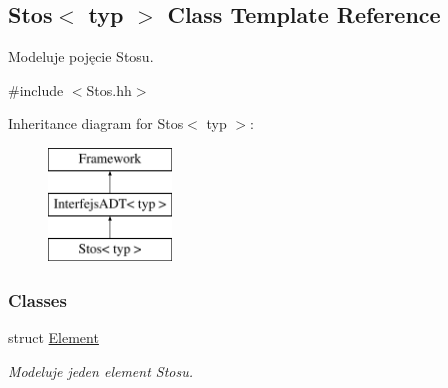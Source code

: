 \hypertarget{class_stos}{\subsection{Stos$<$ typ $>$ Class Template Reference}
\label{class_stos}
}


Modeluje pojęcie Stosu.  




{\ttfamily \#include $<$Stos.\-hh$>$}

Inheritance diagram for Stos$<$ typ $>$\-:\begin{figure}[H]
\begin{center}
\leavevmode
\includegraphics[height=3.000000cm]{class_stos}
\end{center}
\end{figure}
\subsubsection*{Classes}
\begin{DoxyCompactItemize}
\item 
struct \hyperlink{struct_stos_1_1_element}{Element}
\begin{DoxyCompactList}\small\item\em Modeluje jeden element Stosu. \end{DoxyCompactList}\end{DoxyCompactItemize}
